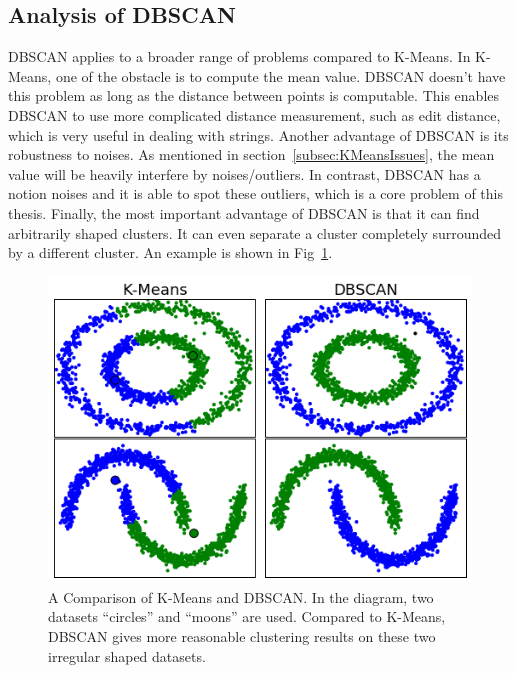 \subsection{Analysis of DBSCAN}
\label{subsec:DBSCANalgorithm}
DBSCAN applies to a broader range of problems compared to K-Means. In K-Means, one of the obstacle is to compute the mean value. DBSCAN doesn't have this problem as long as the distance between points is computable. This enables DBSCAN to use more complicated distance measurement, such as edit distance, which is very useful in dealing with strings. Another advantage of DBSCAN is its robustness to noises. As mentioned in section~\ref{subsec:KMeansIssues}, the mean value will be heavily interfere by noises/outliers. In contrast, DBSCAN has a notion noises and it is able to spot these outliers, which is a core problem of this thesis. Finally, the most important advantage of DBSCAN is that it can find arbitrarily shaped clusters. It can even separate a cluster completely surrounded by a different cluster. An example is shown in Fig~\ref{fig:KMeansDBSCAN}.

\begin{figure}
	\begin{center}
		\includegraphics[width=\textwidth]{images/KMeansDBSCAN.png}
		\caption{A Comparison of K-Means and DBSCAN. In the diagram, two datasets ``circles'' and ``moons'' are used. Compared to K-Means, DBSCAN gives more reasonable clustering results on these two irregular shaped datasets.}
		\label{fig:KMeansDBSCAN}
	\end{center}
\end{figure}

